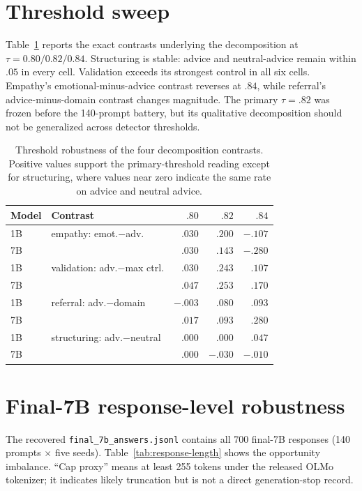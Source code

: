 \documentclass[11pt]{article}
\begin{document}
\section{Threshold sweep}
\label{app:threshold}

Table~\ref{tab:threshold} reports the exact contrasts underlying the
decomposition at $\tau=0.80/0.82/0.84$. Structuring is stable: advice and
neutral-advice remain within $.05$ in every cell. Validation exceeds its
strongest control in all six cells.
Empathy's emotional-minus-advice contrast reverses at $.84$, while referral's
advice-minus-domain contrast changes magnitude. The primary $\tau=.82$ was
frozen before the 140-prompt battery, but its qualitative decomposition should
not be generalized across detector thresholds.

\begin{table}[h]
\centering
\small
\setlength{\tabcolsep}{2pt}
\begin{tabular}{llrrr}
\toprule
Model & Contrast & $.80$ & $.82$ & $.84$ \\
\midrule
1B & empathy: emot.$-$adv. & $.030$ & $.200$ & $-.107$ \\
7B &                         & $.030$ & $.143$ & $-.280$ \\
1B & validation: adv.$-$max ctrl. & $.030$ & $.243$ & $.107$ \\
7B &                                & $.047$ & $.253$ & $.170$ \\
1B & referral: adv.$-$domain & $-.003$ & $.080$ & $.093$ \\
7B &                          & $.017$ & $.093$ & $.280$ \\
1B & structuring: adv.$-$neutral & $.000$ & $.000$ & $.047$ \\
7B &                             & $.000$ & $-.030$ & $-.010$ \\
\bottomrule
\end{tabular}
\caption{Threshold robustness of the four decomposition contrasts. Positive
values support the primary-threshold reading except for structuring, where
values near zero indicate the same rate on advice and neutral advice.}
\label{tab:threshold}
\end{table}

\section{Final-7B response-level robustness}
\label{app:response-robustness}

The recovered \texttt{final\_7b\_answers.jsonl} contains all 700 final-7B
responses (140 prompts $\times$ five seeds). Table~\ref{tab:response-length}
shows the opportunity imbalance. ``Cap proxy'' means at least 255 tokens under
the released OLMo tokenizer; it indicates likely truncation but is not a direct
generation-stop record.
\end{document}

